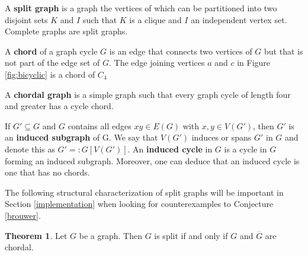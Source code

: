 \documentclass[11pt]{article}
\theoremstyle{definition}
\newtheorem{thm}{Theorem}
\begin{document}
A \textbf{split graph} is a graph the vertices of which can be partitioned into two disjoint sets $K$ and $I$ such that $K$ is a clique and $I$ an independent vertex set. Complete graphs are split graphs.

A \textbf{chord} of a graph cycle $G$ is an edge that connects two vertices of $G$ but that is not part of the edge set of $G$. The edge joining vertices $a$ and $c$ in Figure \ref{fig:bicyclic} is a chord of $C_4$

A \textbf{chordal graph} is a simple graph such that every graph cycle of length four and greater has a cycle chord.

If $G' \subseteq G$ and $G$ contains all edges $xy \in E(G)$ with $x, y \in V(G')$, then $G'$ is an \textbf{induced subgraph} of G. We say that $V(G')$ induces or spans $G'$ in $G$ and denote this as $G' =: G[V(G')]$. An \textbf{induced cycle} in $G$ is a cycle in $G$ forming an induced subgraph. Moreover, one can deduce that an induced cycle is one that has no chords. 

The following structural characterization of split graphs will be important in Section \ref{implementation} when looking for counterexamples to Conjecture \ref{brouwer}.

\begin{thm}
Let $G$ be a graph. Then $G$ is split if and only if $G$ and $\overline{G}$ are chordal. 
\end{thm}
\end{document}
